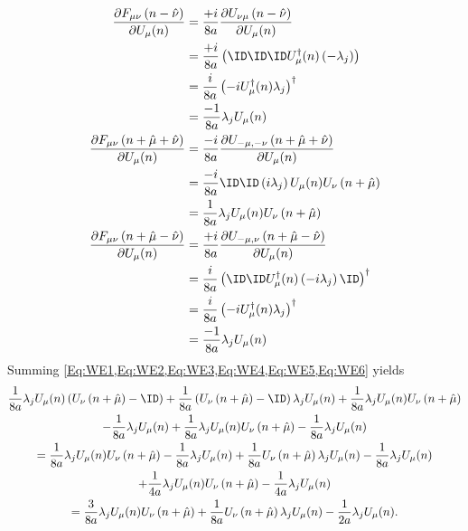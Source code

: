\begin{align}
		\frac{\partial F_{\mu\nu}\left(n-\hat{\nu}\right)}{\partial U_\mu(n)}&=
		\frac{+i}{8a}\frac{\partial U_{\nu\mu}\left(n-\hat{\nu}\right)}{\partial U_\mu(n)}\nonumber\\&=
		\frac{+i}{8a}\left(\ID\ID\ID U^\dagger_\mu(n)\left(-\lambda_j\right)\right)\nonumber\\&=
		\frac{i}{8a}\left(-i U^\dagger_\mu(n)\lambda_j\right)^\dagger\nonumber\\&=
		\frac{-1}{8a}\lambda_j U_\mu(n)\label{Eq:WE4}\\
		\frac{\partial F_{\mu\nu}\left(n+\hat{\mu}+\hat{\nu}\right)}{\partial U_\mu(n)}&=
		\frac{-i}{8a}\frac{\partial U_{-\mu,-\nu}\left(n+\hat{\mu}+\hat{\nu}\right)}{\partial U_\mu(n)}\nonumber\\&=
		\frac{-i}{8a}\ID\ID\left(i\lambda_j\right)U_\mu(n)U_\nu\left(n+\hat{\mu}\right)\nonumber\\&=
		\frac{1}{8a}\lambda_j U_\mu(n)U_\nu\left(n+\hat{\mu}\right)\label{Eq:WE5}\\
		\frac{\partial F_{\mu\nu}\left(n+\hat{\mu}-\hat{\nu}\right)}{\partial U_\mu(n)}&=
		\frac{+i}{8a}\frac{\partial U_{-\mu,\nu}\left(n+\hat{\mu}-\hat{\nu}\right)}{\partial U_\mu(n)}\nonumber\\&=
		\frac{i}{8a}\left(\ID\ID U^\dagger_\mu(n)\left(-i\lambda_j\right)\ID\right)^\dagger\nonumber\\&=
		\frac{i}{8a}\left(-i U^\dagger_\mu(n)\lambda_j\right)^\dagger\nonumber\\&=
		\frac{-1}{8a}\lambda_j U_\mu(n)\label{Eq:WE6}
	\end{align}
	Summing \cref{Eq:WE1,Eq:WE2,Eq:WE3,Eq:WE4,Eq:WE5,Eq:WE6} yields
	\begin{multline}\label{Eq:WE_Force_Cont_Sum}
		\frac{1}{8a}\lambda_j U_\mu(n)\left(U_\nu\left(n+\hat{\mu}\right)-\ID\right)+
		\frac{1}{8a}\left(U_\nu\left(n+\hat{\mu}\right)-\ID\right)\lambda_j U_\mu(n)+
		\frac{1}{8a}\lambda_j U_\mu(n)U_\nu\left(n+\hat{\mu}\right)\\-
		\frac{1}{8a}\lambda_j U_\mu(n)+
		\frac{1}{8a}\lambda_j U_\mu(n)U_\nu\left(n+\hat{\mu}\right)-
		\frac{1}{8a}\lambda_j U_\mu(n)\\=
		\frac{1}{8a}\lambda_jU_\mu(n)U_\nu\left(n+\hat{\mu}\right)-\frac{1}{8a}\lambda_jU_\mu(n)+
		\frac{1}{8a}U_\nu\left(n+\hat{\mu}\right)\lambda_jU_\mu(n)-\frac{1}{8a}\lambda_jU_\mu(n)\\+
		\frac{1}{4a}\lambda_j U_\mu(n)U_\nu\left(n+\hat{\mu}\right)-\frac{1}{4a}\lambda_j U_\mu(n)\\=
		\frac{3}{8a}\lambda_j U_\mu(n)U_\nu\left(n+\hat{\mu}\right)+
		\frac{1}{8a}U_\nu\left(n+\hat{\mu}\right)\lambda_j U_\mu(n)-
		\frac{1}{2a}\lambda_j U_\mu(n)\text{.}
	\end{multline}
